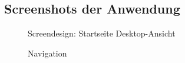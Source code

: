 \subsection{Screenshots der Anwendung}
\label{Screenshots}

\begin{figure}[h]
\centering
{}
\caption{Screendesign: Startseite Desktop-Ansicht}
\end{figure}

\begin{figure}[h]
\centering
{}
\caption{Navigation}
\end{figure}

\clearpage
